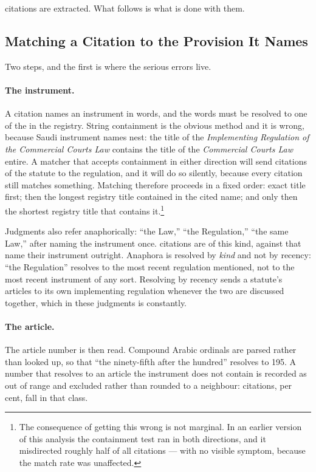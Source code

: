 \documentclass[12pt]{article}
\begin{document}
\nCitations{} citations are extracted. What follows is what is done with them.

\subsection{Matching a Citation to the Provision It Names}

Two steps, and the first is where the serious errors live.

\paragraph{The instrument.} A citation names an instrument in words, and the
words must be resolved to one of the \nInstruments{} in the registry. String
containment is the obvious method and it is wrong, because Saudi instrument
names nest: the title of the \emph{Implementing Regulation of the Commercial
Courts Law} contains the title of the \emph{Commercial Courts Law} entire. A
matcher that accepts containment in either direction will send citations of
the statute to the regulation, and it will do so silently, because every
citation still matches something. Matching therefore proceeds in a fixed
order: exact title first; then the longest registry title contained in the
cited name; and only then the shortest registry title that contains
it.\footnote{The consequence of getting this wrong is not marginal. In an
earlier version of this analysis the containment test ran in both directions,
and it misdirected roughly half of all citations --- with no visible symptom,
because the match rate was unaffected.}

Judgments also refer anaphorically: ``the Law,'' ``the Regulation,'' ``the
same Law,'' after naming the instrument once. \nAnaphoric{} citations are of
this kind, against \nNamed{} that name their instrument outright. Anaphora is
resolved by \emph{kind} and not by recency: ``the Regulation'' resolves to the
most recent regulation mentioned, not to the most recent instrument of any
sort. Resolving by recency sends a statute's articles to its own implementing
regulation whenever the two are discussed together, which in these judgments
is constantly.

\paragraph{The article.} The article number is then read. Compound Arabic
ordinals are parsed rather than looked up, so that ``the ninety-fifth after
the hundred'' resolves to 195. A number that resolves to an article the
instrument does not contain is recorded as out of range and excluded rather
than rounded to a neighbour: \nOutOfRange{} citations, \nOutOfRangeShare{} per
cent, fall in that class.
\end{document}
